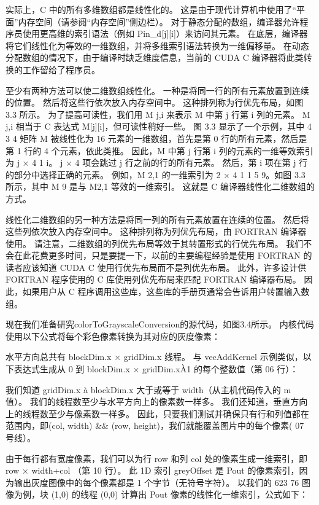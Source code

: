 实际上，C 中的所有多维数组都是线性化的。 这是由于现代计算机中使用了“平面”内存空间（请参阅“内存空间”侧边栏）。 对于静态分配的数组，编译器允许程序员使用更高维的索引语法（例如 Pin\_d[j][i]）来访问其元素。 在底层，编译器将它们线性化为等效的一维数组，并将多维索引语法转换为一维偏移量。 在动态分配数组的情况下，由于编译时缺乏维度信息，当前的 CUDA C 编译器将此类转换的工作留给了程序员。

至少有两种方法可以使二维数组线性化。 一种是将同一行的所有元素放置到连续的位置。 然后将这些行依次放入内存空间中。 这种排列称为行优先布局，如图 3.3 所示。 为了提高可读性，我们用 M j,i 来表示 M 中第 j 行第 i 列的元素。 M j,i 相当于 C 表达式 M[j][i]，但可读性稍好一些。 图 3.3 显示了一个示例，其中 4 3 4 矩阵 M 被线性化为 16 元素的一维数组，首先是第 0 行的所有元素，然后是第 1 行的 4 个元素，依此类推。 因此，M 中第 j 行第 i 列的元素的一维等效索引为 j × 4 1 i。 j × 4 项会跳过 j 行之前的行的所有元素。 然后，第 i 项在第 j 行的部分中选择正确的元素。 例如，M 2,1 的一维索引为 2 × 4 1 1 5 9。如图 3.3 所示，其中 M 9 是与 M2,1 等效的一维索引。 这就是 C 编译器线性化二维数组的方式。

线性化二维数组的另一种方法是将同一列的所有元素放置在连续的位置。 然后将这些列依次放入内存空间中。 这种排列称为列优先布局，由 FORTRAN 编译器使用。 请注意，二维数组的列优先布局等效于其转置形式的行优先布局。 我们不会在此花费更多时间，只是要提一下，以前的主要编程经验是使用 FORTRAN 的读者应该知道 CUDA C 使用行优先布局而不是列优先布局。 此外，许多设计供 FORTRAN 程序使用的 C 库使用列优先布局来匹配 FORTRAN 编译器布局。 因此，如果用户从 C 程序调用这些库，这些库的手册页通常会告诉用户转置输入数组。

现在我们准备研究colorToGrayscaleConversion的源代码，如图3.4所示。 内核代码使用以下公式将每个彩色像素转换为其对应的灰度像素：

水平方向总共有 blockDim.x × gridDim.x 线程。 与 vecAddKernel 示例类似，以下表达式生成从 0 到 blockDim.x × gridDim.xÀ1 的每个整数值（第 06 行）：

我们知道 gridDim.x à blockDim.x 大于或等于 width（从主机代码传入的 m 值）。 我们的线程数至少与水平方向上的像素数一样多。 我们还知道，垂直方向上的线程数至少与像素数一样多。 因此，只要我们测试并确保只有行和列值都在范围内，即(col, width) \&\& (row, height)，我们就能覆盖图片中的每个像素( 07 号线）。

由于每行都有宽度像素，我们可以为行 row 和列 col 处的像素生成一维索引，即 row × width+col （第 10 行）。 此 1D 索引 greyOffset 是 Pout 的像素索引，因为输出灰度图像中的每个像素都是 1 个字节（无符号字符）。 以我们的 623 76 图像为例，块 (1,0) 的线程 (0,0) 计算出 Pout 像素的线性化一维索引，公式如下：

